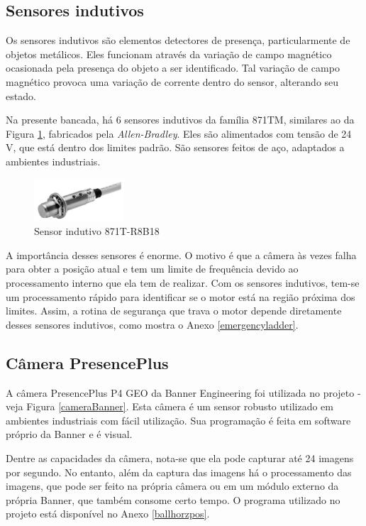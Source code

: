 \subsection{Sensores indutivos}
Os sensores indutivos são elementos detectores de presença, particularmente de objetos metálicos. Eles funcionam através da variação de campo magnético ocasionada pela presença do objeto a ser identificado. Tal variação de campo magnético provoca uma variação de corrente dentro do sensor, alterando seu estado.

Na presente bancada, há 6 sensores indutivos da família 871TM, similares ao da Figura \ref{sensorIndutivo}, fabricados pela \textit{Allen-Bradley}. Eles são alimentados com tensão de 24 V, que está dentro dos limites padrão. São sensores feitos de aço, adaptados a ambientes industriais.

\begin{figure}[!ht]
  \centering
    \includegraphics[width=0.3\textwidth]{figs/fundamentos/sensorIndutivo}
    \caption{Sensor indutivo 871T-R8B18 \cite{redytton}\label{sensorIndutivo}}
\end{figure}

A importância desses sensores é enorme. O motivo é que a câmera às vezes falha para obter a posição atual e tem um limite de frequência devido ao processamento interno que ela tem de realizar. Com os sensores indutivos, tem-se um processamento rápido para identificar se o motor está na região próxima dos limites. Assim, a rotina de segurança que trava o motor depende diretamente desses sensores indutivos, como mostra o Anexo \ref{emergencyladder}.

\subsection{Câmera PresencePlus}

A câmera PresencePlus P4 GEO da Banner Engineering foi utilizada no projeto - veja Figura \ref{cameraBanner}. Esta câmera é um sensor robusto utilizado em ambientes industriais com fácil utilização. Sua programação é feita em software próprio da Banner e é visual.

Dentre as capacidades da câmera, nota-se que ela pode capturar até 24 imagens por segundo. No entanto, além da captura das imagens há o processamento das imagens, que pode ser feito na própria câmera ou em um módulo externo da própria Banner, que também consome certo tempo. O programa utilizado no projeto está disponível no Anexo \ref{ballhorzpos}.

